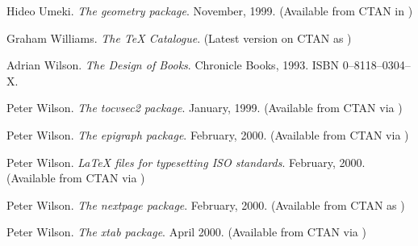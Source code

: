 \begin{thebibliography}{GMS94A}
  Hideo Umeki.
  \newblock \emph{The geometry package}.
  \newblock November, 1999.
  \newblock (Available from CTAN in
            )


\begin{comment}
\bibitem[Whe95]{WHEILDON95}
  Colin Wheildon.
  \newblock \emph{Type \& Layout}.
  \newblock Strathmore Press, 1995.
  \newblock ISBN 0--9624891--5--8.
\end{comment}

  Graham Williams.
  \newblock \emph{The TeX Catalogue}.
  \newblock (Latest version on CTAN as 
  )

  Adrian Wilson.
  \newblock \emph{The Design of Books}.
  \newblock Chronicle Books, 1993.
  \newblock ISBN 0--8118--0304--X.


  Peter Wilson.
  \newblock \emph{The tocvsec2 package}.
  \newblock January, 1999.
  \newblock (Available from CTAN via 
            )

  Peter Wilson.
  \newblock \emph{The epigraph package}.
  \newblock February, 2000.
  \newblock (Available from CTAN via
            )

  Peter Wilson.
  \newblock \emph{LaTeX files for typesetting ISO standards}.
  \newblock February, 2000.
  \newblock (Available from CTAN via 
            )

  Peter Wilson.
  \newblock \emph{The nextpage package}.
  \newblock February, 2000.
  \newblock (Available from CTAN as 
            )

\begin{comment}
\bibitem[Wil00d]{NEEDSPACE}
  Peter Wilson.
  \newblock \emph{The needspace package}.
  \newblock March, 2000.
  \newblock (Available from CTAN as 
            \url{/macros/latex/contrib/misc/needspace.sty})
\end{comment}

  Peter Wilson.
  \newblock \emph{The xtab package}.
  \newblock April 2000.
  \newblock (Available from CTAN via
             )


\end{thebibliography}
